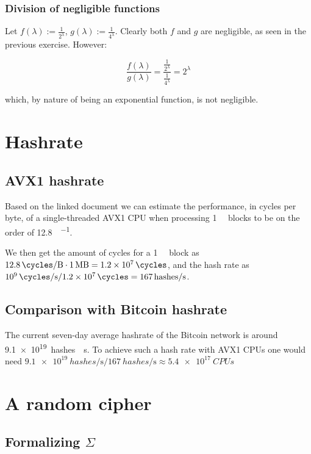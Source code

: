 \documentclass[a4paper]{scrreprt}
\begin{document}
\subsubsection{Division of negligible functions}

Let $f(\lambda) := \frac{1}{2^\lambda}$, $g(\lambda) := \frac{1}{4^\lambda}$.
Clearly both $f$ and $g$ are negligible, as seen in the previous exercise.
However:

\[
	\frac{f(\lambda)}{g(\lambda)} = \frac{\frac{1}{2^\lambda}}{\frac{1}{4^\lambda}} = 2^\lambda
\]

which, by nature of being an exponential function, is not negligible.

\section{Hashrate}

\subsection{AVX1 hashrate}

Based on the linked document we can estimate the performance, in cycles per
byte, of a single-threaded AVX1 CPU when processing \SI{1}{\mega\byte} blocks to be on
the order of \SI{12.8}{\cycles \per \byte}.

We then get the amount of cycles for a \SI{1}{\mega\byte} block as
$\SI{12.8}{\cycles \per \byte} \cdot \SI{1}{\mega\byte} = \SI{1.2e7}{\cycles}$,
and the hash rate as $\SI{e9}{\cycles \per \second} / \SI{1.2e7}{\cycles} =
\SI{167}{hashes \per \second}$.

\subsection{Comparison with Bitcoin hashrate}

The current seven-day average hashrate of the Bitcoin network is around
\SI{9.1e19}{hashes \per \second}. To achieve such a hash rate with AVX1 CPUs
one would need $\SI{9.1e19}{hashes \per \second} / \SI{167}{hashes \per
\second} \approx \SI{5.4e17}{CPUs}$

\section{A random cipher}

\subsection{Formalizing $\Sigma$}
\end{document}
